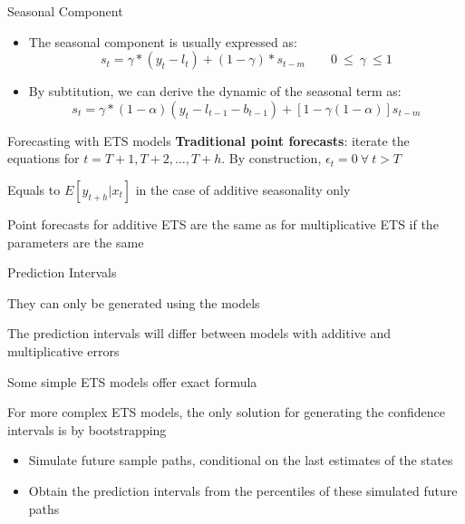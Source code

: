 \documentclass{beamer}
\newenvironment{wideitemize}{\itemize\addtolength{\itemsep}{10pt}}{\enditemize}
\begin{document}
\begin{frame}{Seasonal Component}
  \begin{itemize}
  \item The seasonal component is usually expressed as:
    \begin{equation*}
      s_t = \gamma*(y_t - l_t) + (1-\gamma)*s_{t-m} \qquad 0 \ \leq \ \gamma \ \leq 1
    \end{equation*}
  \item By subtitution, we can derive the dynamic of the seasonal term as:
    \begin{equation*}
      s_t = \gamma*(1-\alpha)(y_t - l_{t-1} - b_{t-1}) + [1 - \gamma(1-\alpha)] s_{t-m}
    \end{equation*}
  \end{itemize}  
\end{frame}




\begin{frame}{Forecasting with ETS models}
\textbf{Traditional point forecasts}: iterate the equations for $t = T+1, T+2, \dots, T+h$. By construction, $\epsilon_t = 0 \ \forall \ t>T$

\begin{wideitemize}
\item Equals to $E[y_{t+h}|x_t]$ in the case of additive seasonality only
\item Point forecasts for additive ETS are the same as for multiplicative ETS if the parameters are the same
\end{wideitemize}
  
\end{frame}



\begin{frame}{Prediction Intervals}

  \begin{wideitemize}
  \item They can only be generated using the models
  \item The prediction intervals will differ between models with additive and multiplicative errors
  \item Some simple ETS models offer exact formula
  \item For more complex ETS models, the only solution for generating the confidence intervals is by bootstrapping
    \begin{itemize}
    \item Simulate future sample paths, conditional on the last estimates of the states
    \item Obtain the prediction intervals from the percentiles of these simulated future paths
    \end{itemize}
  \end{wideitemize}
  
\end{frame}
\end{document}
